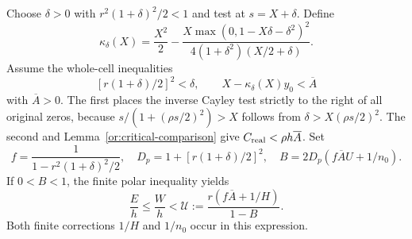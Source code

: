 Choose $\delta>0$ with $r^2(1+\delta)^2/2<1$ and test at
$s=X+\delta$. Define
\begin{equation}\label{sm:extension-kappa}
 \kappa_\delta(X)=\frac{X^2}{2}
 -\frac{X\max(0,1-X\delta-\delta^2)^2}
           {4(1+\delta^2)(X/2+\delta)}.
\end{equation}
Assume the whole-cell inequalities
\begin{equation}\label{sm:extension-A}
 [r(1+\delta)/2]^2<\delta,\qquad
 X-\kappa_\delta(X)y_0<\overline A
\end{equation}
with $\overline A>0$. The first places the inverse Cayley test
strictly to the right of all original zeros, because
$s/(1+(\rho s/2)^2)>X$ follows from
$\delta>X(\rho s/2)^2$. The second and
Lemma~\ref{or:critical-comparison} give
$C_{\rm real}<\rho h\overline A$.
Set
\[
 f=\frac1{1-r^2(1+\delta)^2/2},\quad
 D_p=1+[r(1+\delta)/2]^2,\quad
 B=2D_p(f\overline A U+1/n_0).
\]
If $0<B<1$, the finite polar inequality yields
\begin{equation}\label{sm:extension-HB-upper}
 \frac Eh\le\frac Wh<
       \mathcal U:=\frac{r(f\overline A+1/H)}{1-B}.
\end{equation}
Both finite corrections $1/H$ and $1/n_0$ occur in this expression.

